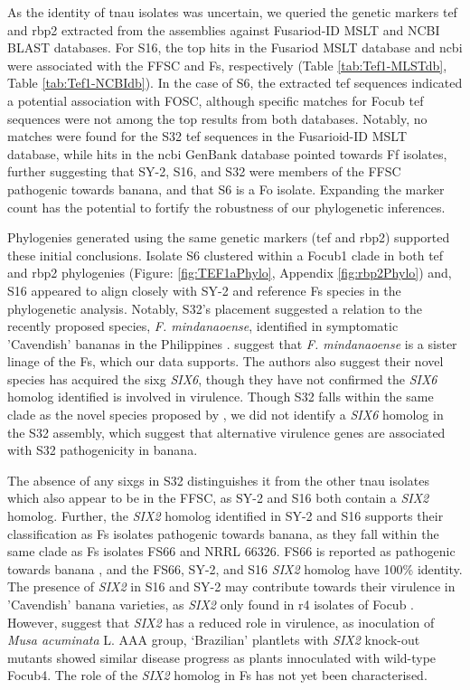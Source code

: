 As the identity of \ac{tnau} isolates was uncertain, we queried the genetic markers \acf{tef} and \acf{rbp2} extracted from the assemblies against Fusariod-ID MSLT and NCBI BLAST databases. For S16, the top hits in the Fusariod MSLT database and \ac{ncbi} were associated with the \ac{FFSC} and \ac{Fs}, respectively (Table \ref{tab:Tef1-MLSTdb}, Table \ref{tab:Tef1-NCBIdb}). In the case of S6, the extracted \ac{tef} sequences indicated a potential association with \ac{FOSC}, although specific matches for \ac{Focub} \ac{tef} sequences were not among the top results from both databases. Notably, no matches were found for the S32 \ac{tef} sequences in the Fusarioid-ID MSLT database, while hits in the \ac{ncbi} GenBank database pointed towards \ac{Ff} isolates, further suggesting that SY-2, S16, and S32 were members of the \ac{FFSC} pathogenic towards banana, and that S6 is a \ac{Fo} isolate. Expanding the marker count has the potential to fortify the robustness of our phylogenetic inferences. 

Phylogenies generated using the same genetic markers (\ac{tef} and \ac{rbp2}) supported these initial conclusions. Isolate S6 clustered within a \ac{Focub1} clade in both \acs{tef} and \ac{rbp2} phylogenies (Figure: \ref{fig:TEF1aPhylo}, Appendix \ref{fig:rbp2Phylo}) and, S16 appeared to align closely with SY-2 and reference \ac{Fs} species in the phylogenetic analysis. Notably, S32's placement suggested a relation to the recently proposed species, \textit{F. mindanaoense}, identified in symptomatic 'Cavendish' bananas in the Philippines \parencite{Nozawa2023}. \textcite{Nozawa2023} suggest that \textit{F. mindanaoense} is a sister linage of the \ac{Fs}, which our data supports. The authors also suggest their novel species has acquired the \ac{sixg} \textit{SIX6}, though they have not confirmed the \textit{SIX6} homolog identified is involved in virulence. Though S32 falls within the same clade as the novel species proposed by \textcite{Nozawa2023}, we did not identify a \textit{SIX6} homolog in the S32 assembly, which suggest that alternative virulence genes are associated with S32 pathogenicity in banana. 

The absence of any \acp{sixg} in S32 distinguishes it from the other \ac{tnau} isolates which also appear to be in the \ac{FFSC}, as SY-2 and S16 both contain a \textit{SIX2} homolog. Further, the \textit{SIX2} homolog identified in SY-2 and S16 supports their classification as \ac{Fs} isolates pathogenic towards banana, as they fall within the same clade as \ac{Fs} isolates FS66 and NRRL 66326. FS66 is reported as pathogenic towards banana \parencite{Cui2021}, and the FS66, SY-2, and S16 \textit{SIX2} homolog have 100\% identity. The presence of \textit{SIX2} in S16 and SY-2 may contribute towards their virulence in 'Cavendish' banana varieties, as \textit{SIX2} only found in \ac{r4} isolates of \ac{Focub} \parencite{Czislowski2018}. However, \textcite{An2019} suggest that \textit{SIX2} has a reduced role in virulence, as inoculation of \textit{Musa acuminata} L. AAA group, ‘Brazilian’ plantlets with \textit{SIX2} knock-out mutants showed similar disease progress as plants innoculated with wild-type \ac{Focub4}. The role of the \textit{SIX2} homolog in \ac{Fs} has not yet been characterised. 

